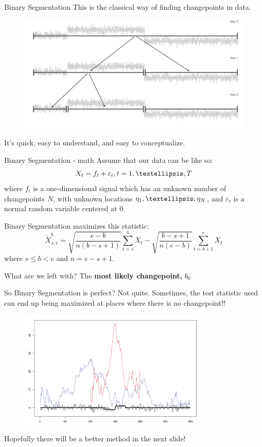 \documentclass[10pt]{beamer}
\begin{document}
\begin{frame}[t]{Binary Segmentation}
  This is the classical way of finding changepoints in data.
  \begin{figure}
    \includegraphics[width=\textwidth]{../wsb_figures/schema_binseg.png}
  \end{figure}
  It's quick, easy to understand, and easy to conceptualize.
\end{frame}

\begin{frame}[t]{Binary Segmentation - math}
Assume that our data can be like so:
\[X_t = f_t+\varepsilon_t,  t = 1, \textellipsis,T  \]
where \(f_t\) is a one-dimensional signal which has an unknown number of changepoints  \(N\), with unknown locations  \(\eta_1, \textellipsis, \eta_N\), and  \(\varepsilon_t\) is a normal random variable centered at 0.

Binary Segmentation maximizes this statistic:
\[
\tilde{X}^{b}_{s,e} = \sqrt{\frac{e - b}{n(b-s+1)}} \sum_{t=s}^{b}X_t - \sqrt{\frac{b-s+1}{n(e - b)}} \sum_{t=b+1}^{e}X_t
\]
where \( s \leq b < e \) and \( n = e - s + 1 \).

What are we left with?
The \textbf{most likely changepoint,} \(b_0\)

\end{frame}

\begin{frame}[t]{So Binary Segmentation is perfect?}
  Not quite.
  Sometimes, the test statistic used can end up being maximized at places where there is no changepoint!!

  \begin{figure}
    \includegraphics[width=0.8\textwidth]{../report/bsisBS.png}
  \end{figure}
  Hopefully there will be a better method in the next slide!
\end{frame}
\end{document}
